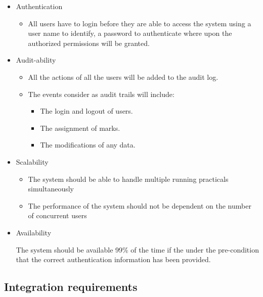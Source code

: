 \documentclass[12pt]{article}
\begin{document}
			\begin{itemize}
			
				\item Authentication
					\begin{itemize}
						\item All users have to login before they are able to access the system using a user name to identify, a password to authenticate where upon the authorized permissions will be granted.
					\end{itemize}
				
				\item Audit-ability
					\begin{itemize}
						\item All the actions of all the users will be added to the audit log.
						\item The events consider as audit trails will include:
						
						\begin{itemize}
							\item The login and logout of users.
							\item The assignment of marks.
							\item The modifications of any data.
						\end{itemize}	
					\end{itemize}

				\item Scalability
					\begin{itemize}
						\item The system should be able to handle multiple running practicals simultaneously
						\item The performance of the system should not be dependent on the number of concurrent users
					\end{itemize}
				
				\item Availability
				
					\begin{flushleft}
						The system should be available 99\% of the time if the under the pre-condition that the correct authentication information has been provided.
					\end{flushleft}
					
			\end{itemize}

		\subsection{Integration requirements}
		
\end{document}
